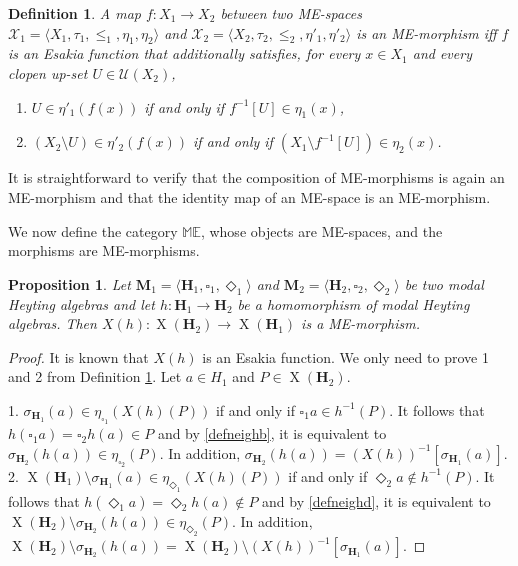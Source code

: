 \documentclass[pdflatex,sn-mathphys-num]{sn-jnl}%
\newcommand{\He}{\mathbf{H}}
\newcommand{\X}[1]{\operatorname{X}(#1)}
\theoremstyle{thmstyleone}%
\newtheorem{proposition}[theorem]{Proposition}%
\theoremstyle{thmstyletwo}%
\theoremstyle{thmstylethree}%
\newtheorem{definition}{Definition}%
\begin{document}
\begin{definition}\label{MEmorphism}
A map $f \colon X_1\to X_2$	 between two ME-spaces $\mathcal{X}_1=\langle X_1,\tau_1,\leq_1,\eta_1,\eta_2\rangle$ and $\mathcal{X}_2=\langle X_2,\tau_2,\leq_2,\eta'_1,\eta'_2\rangle$ is an ME-morphism iff $f$ is an Esakia function that additionally satisﬁes, for every $x\in X_1$ and every clopen up-set $U\in\mathcal{U}(X_2)$,
\begin{enumerate}
    \item $U\in \eta'_1	(f(x))$ if and only if $f^{-1}[U]\in\eta_1(x)$,
\item $(X_2\setminus U)\in \eta'_2(f(x))$ if and only if $(X_1\setminus f^{-1}[U])\in \eta_2(x)$.
\end{enumerate}
\end{definition}

It is straightforward to verify that the composition of ME-morphisms is again an ME-morphism and that the identity map of an ME-space is an ME-morphism. 

We now define the category $\mathbb{ME}$, whose objects are ME-spaces, and the morphisms are ME-morphisms.


\begin{proposition}
   Let $\mathbf{M}_1=\langle \He_1,\square_1,\Diamond_1\rangle$ and $\mathbf{M}_2=\langle \He_2,\square_2,\Diamond_2\rangle$ be two modal Heyting algebras and let $h\colon \He_1\to \He_2 $ be a homomorphism of modal Heyting algebras. Then $X(h)\colon \X{\He_2}\to\X{\He_1}$ is a ME-morphism.
\end{proposition}
\begin{proof}
    It is known that $X(h)$ is an Esakia function. We only need to prove 1 and 2 from Definition \ref{MEmorphism}. Let $a\in H_1$ and $P\in \X{\He_2}$.
    
    1. $\sigma_{\He_1}(a)\in \eta_{\square_1}(X(h)(P))$ if and only if $\square_1a\in h^{-1}(P)$. It follows that $h(\square_1a)=\square_2h(a)\in P$ and by \eqref{defneighb}, it is equivalent to $\sigma_{\He_2}(h(a))\in \eta_{\square_2}(P)$. In addition, $\sigma_{\He_2}(h(a))=(X(h))^{-1}[\sigma_{\He_1}(a)]$.\\
    2. $\X{\He_1}\setminus\sigma_{\He_1}(a)\in \eta_{\Diamond_1}(X(h)(P))$ if and only if $\Diamond_2a\notin h^{-1}(P)$. It follows that $h(\Diamond_1a)=\Diamond_2h(a)\notin P$ and by \eqref{defneighd}, it is equivalent to $\X{\He_2}\setminus\sigma_{\He_2}(h(a))\in \eta_{\Diamond_2}(P)$. In addition, $\X{\He_2}\setminus\sigma_{\He_2}(h(a))=\X{\He_2}\setminus(X(h))^{-1}[\sigma_{\He_1}(a)]$.
\end{proof}
\end{document}
